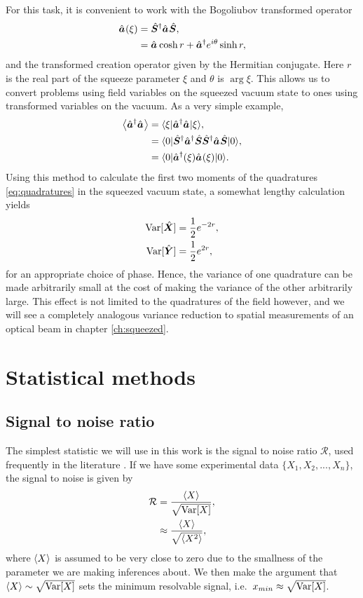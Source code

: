 For this task, it is convenient to work with the Bogoliubov transformed operator
\begin{align}
  \hat{\bm a}_{}(\xi) &= \hat{\bm S}^\dagger \hat{\bm a}_{} \hat{\bm S}, \nonumber \\
                          &= \hat{\bm a}_{} \cosh r + \hat{\bm a}^\dagger_{} e^{i\theta}\sinh r,
\end{align}
and the transformed creation operator given by the Hermitian conjugate.  Here $r$ is the real part of the squeeze parameter $\xi$ and $\theta$ is $\arg{\xi}$.  This allows us to convert problems using field variables on the squeezed vacuum state to ones using transformed variables on the vacuum.  As a very simple example,
\begin{align}
  \left\langle \hat{\bm a}^\dagger_{}\hat{\bm a}_{} \right\rangle &= \langle \xi \rvert\hat{\bm a}^\dagger_{}\hat{\bm a}_{}\lvert \xi\rangle, \nonumber \\
                            &= \langle 0 \rvert\hat{\bm S}^\dagger \hat{\bm a}^\dagger_{} \hat{\bm S}\hat{\bm S}^\dagger \hat{\bm a}_{} \hat{\bm S} \lvert 0\rangle, \nonumber \\
                            &= \langle 0 \rvert\hat{\bm a}^\dagger_{}(\xi) \hat{\bm a}_{}(\xi)\lvert 0\rangle.
\end{align}
Using this method to calculate the first two moments of the quadratures \eqref{eq:quadratures} in the squeezed vacuum state, a somewhat lengthy calculation yields
\begin{align}
  {\rm {Var}}[\hat{\bm X}] &= \frac{1}{2}e^{-2r}, \nonumber \\
  {\rm {Var}}[\hat{\bm Y}] &= \frac{1}{2}e^{2r},
\end{align}
for an appropriate choice of phase.  Hence, the variance of one quadrature can be made arbitrarily small at the cost of making the variance of the other arbitrarily large.  This effect is not limited to the quadratures of the field however, and we will see a completely analogous variance reduction to spatial measurements of an optical beam in chapter \ref{ch:squeezed}.

\section{Statistical methods}
\subsection{Signal to noise ratio}
The simplest statistic we will use in this work is the signal to noise ratio $\mathcal{R}$, used frequently in the literature \cite{Dixon2009, Loudon2000, Starling2009}.  If we have some experimental data $\{X_1, X_2,..., X_n\}$, the signal to noise is given by
\begin{align}
  \nonumber  \mathcal{R} &= \frac{\left\langle X \right\rangle}{\sqrt{{\rm {Var}}[X]}}, \\
                         &\approx \frac{\left\langle X \right\rangle}{\sqrt{\left\langle X^2 \right\rangle}}, 
\end{align}
where $\left\langle X \right\rangle$ is assumed to be very close to zero due to the smallness of the parameter we are making inferences about.  We then make the argument that $\left\langle X \right\rangle \sim \sqrt{{\rm {Var}}[X]}$ sets the minimum resolvable signal, i.e.~$x_{min} \approx \sqrt{{\rm {Var}}[X]}$.  

